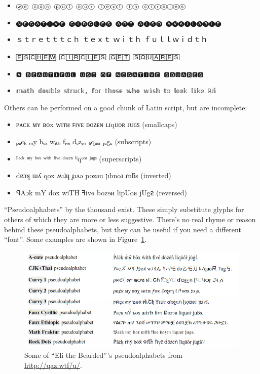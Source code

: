 \documentclass[letterpaper,10pt]{article}
\newenvironment{denseitemize}{
  \begin{itemize}
      \setlength{\itemsep}{0pt}
}{
  \end{itemize}
}
\begin{document}
\begin{denseitemize}
\item{\texttt{ⓦⓔ ⓒⓐⓝ ⓟⓤⓣ ⓞⓤⓡ ⓣⓔⓧⓣ ⓘⓝ ⓒⓘⓡⓒⓛⓔⓢ}}
\item{\texttt{🅝🅔🅖🅐🅣🅘🅥🅔 🅒🅘🅡🅒🅛🅔🅢 🅐🅡🅔 🅐🅛🅢🅞 🅐🅥🅐🅘🅛🅐🅑🅛🅔}}
\item{ｓｔｒｅｔｔｔｃｈ ｔｅｘｔ ｗｉｔｈ ｆｕｌｌｗｉｄｔｈ}
\item{\texttt{🄴🅂🄲🄷🄴🅆 🄲🄸🅁🄲🄻🄴🅂 🄶🄴🅃 🅂🅀🅄🄰🅁🄴🅂}}
\item{\texttt{🅰 🅱🅴🅰🆄🆃🅸🅵🆄🅻 🆄🆂🅴 🅾🅵 🅽🅴🅶🅰🆃🅸🆅🅴 🆂🆀🆄🅰🆁🅴🆂}}
\item{\texttt{𝕞𝕒𝕥𝕙 𝕕𝕠𝕦𝕓𝕝𝕖 𝕤𝕥𝕣𝕦𝕔𝕜, 𝕗𝕠𝕣 𝕥𝕙𝕠𝕤𝕖 𝕨𝕙𝕠 𝕨𝕚𝕤𝕙 𝕥𝕠 𝕝𝕠𝕠𝕜 𝕝𝕚𝕜𝕖 ℝ\^𝕟}}
\end{denseitemize}

Others can be performed on a good chunk of Latin script, but are incomplete:

\begin{denseitemize}
\item{ᴘᴀᴄᴋ ᴍʏ ʙᴏx ᴡɪᴛʜ ꜰɪᴠᴇ ᴅᴏᴢᴇɴ ʟɪqᴜᴏʀ ᴊᴜɢꜱ (smallcaps)}
\item{ₚₐcₖ ₘy bₒₓ wᵢₜₕ fᵢᵥₑ dₒzₑₙ ₗᵢqᵤₒᵣ ⱼᵤgₛ (subscripts)}
\item{ᴾᵃᶜᵏ ᵐʸ ᵇᵒˣ ʷⁱᵗʰ ᶠⁱᵛᵉ ᵈᵒᶻᵉⁿ ˡⁱqᵘᵒʳ ʲᵘᵍˢ (superscripts)}
\item{dɐɔʞ ɯʎ qox ʍıʇɥ ɟıʌǝ pozǝu ןıbnoɹ ɾnƃs (inverted)}
\item{ꟼAↄk mY dox wiTH ꟻivɘ bozɘᴎ lipUoᴙ jUgꙅ (reversed)}
\end{denseitemize}

``Pseudoalphabets'' by the thousand exist. These simply substitute glyphs for
others of which they are more or less suggestive. There's no real rhyme or
reason behind these pseudoalphabets, but they can be useful if you need a
different ``font''. Some examples are shown in Figure~\ref{fig:pseudoalphabets}.

\begin{figure}[!htb]
    \centering
    \includegraphics[width=.75\linewidth]{media/pseudoalphabets.png}
    \caption{Some of ``Eli the Bearded'''s pseudoalphabets from \url{http://qaz.wtf/u/}.}
    \label{fig:pseudoalphabets}
\end{figure}
\end{document}
